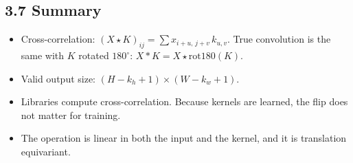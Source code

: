 
\subsection*{3.7 Summary}

\begin{itemize}
  \item Cross-correlation: $(X \star K)_{ij} = \sum x_{i+u,\, j+v}\, k_{u,v}$. True convolution is the same with $K$ rotated $180^\circ$: $X * K = X \star \mathrm{rot180}(K)$.
  \item Valid output size: $(H - k_h + 1) \times (W - k_w + 1)$.
  \item Libraries compute cross-correlation. Because kernels are learned, the flip does not matter for training.
  \item The operation is linear in both the input and the kernel, and it is translation equivariant.
\end{itemize}